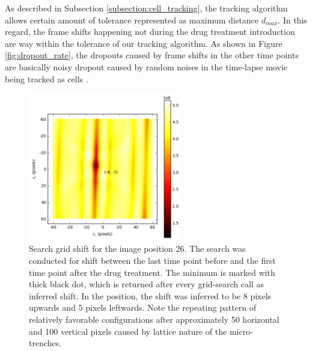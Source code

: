 \documentclass[pdftex,12pt,a4paper]{report}
\begin{document}
As described in Subsection \ref{subsection:cell_tracking}, the tracking algorithm allows certain amount of tolerance represented as maximum distance $d_{max}$. In this regard, the frame shifts happening not during the drug treatment introduction are way within the tolerance of our tracking algorithm. As shown in Figure \ref{fig:dropout_rate}, the dropouts caused by frame shifts in the other time points are basically noisy dropout caused by random noises in the time-lapse movie being tracked as cells \cite{jaqaman2008robust}.

\begin{figure}[H]
\centering
\includegraphics[width=0.6\textwidth]{images/search_grid}
\caption[Example of search grid from the shift inference algorithm]{Search grid shift for the image position 26. The search was conducted for shift between the last time point before and the first time point after the drug treatment. The minimum is marked with thick black dot, which is returned after every grid-search call as inferred shift. In the position, the shift was inferred to be 8 pixels upwards and 5 pixels leftwards. Note the repeating pattern of relatively favorable configurations after approximately 50 horizontal and 100 vertical pixels caused by lattice nature of the micro-trenches.}
\label{fig:searchgrid}
\end{figure}
\end{document}

